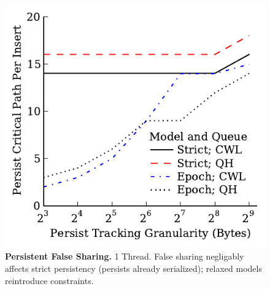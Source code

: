 \begin{figure}
  \centering
  \includegraphics[width=.55\linewidth]{PersistencyEval/FalseSharing.pdf}
  \caption{\textbf{Persistent False Sharing.} 1 Thread.  False sharing negligably affects strict persistency (persists already serialized); relaxed models reintroduce constraints.}
  \label{fig::FalseSharing}
\end{figure}
